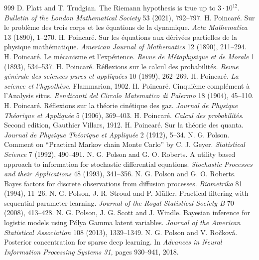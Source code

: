 \begin{thebibliography}{999}
 D. Platt and T. Trudgian. The Riemann hypothesis is true up to $3\cdot10^{12}$. \emph{Bulletin of the London Mathematical Society} 53 (2021), 792--797.
 H. Poincar\'e. Sur le probl\`eme des trois corps et les \'equations de la dynamique. \emph{Acta Mathematica} 13 (1890), 1--270.
 H. Poincar\'e. Sur les \'equations aux d\'eriv\'ees partielles de la physique math\'ematique. \emph{American Journal of Mathematics} 12 (1890), 211--294.
 H. Poincar\'e. Le m\'ecanisme et l'exp\'erience. \emph{Revue de M\'etaphysique et de Morale} 1 (1893), 534--537.
 H. Poincar\'e. R\'eflexions sur le calcul des probabilit\'es. \emph{Revue g\'en\'erale des sciences pures et appliqu\'ees} 10 (1899), 262--269.
 H. Poincar\'e. \emph{La science et l'hypoth\`ese}. Flammarion, 1902.
 H. Poincar\'e. Cinqui\`eme compl\'ement \`a l'Analysis situs. \emph{Rendiconti del Circolo Matematico di Palermo} 18 (1904), 45--110.
 H. Poincar\'e. R\'eflexions sur la th\'eorie cin\'etique des gaz. \emph{Journal de Physique Th\'eorique et Appliqu\'ee} 5 (1906), 369--403.
 H. Poincar\'e. \emph{Calcul des probabilit\'es}. Second edition, Gauthier Villars, 1912.
 H. Poincar\'e. Sur la th\'eorie des quanta. \emph{Journal de Physique Th\'eorique et Appliqu\'ee} 2 (1912), 5--34.
 N. G. Polson. Comment on ``Practical Markov chain Monte Carlo'' by C. J. Geyer. \emph{Statistical Science} 7 (1992), 490--491.
 N. G. Polson and G. O. Roberts. A utility based approach to information for stochastic differential equations. \emph{Stochastic Processes and their Applications} 48 (1993), 341--356.
 N. G. Polson and G. O. Roberts. Bayes factors for discrete observations from diffusion processes. \emph{Biometrika} 81 (1994), 11--26.
 N. G. Polson, J. R. Stroud and P. M\"uller. Practical filtering with sequential parameter learning. \emph{Journal of the Royal Statistical Society B} 70 (2008), 413--428.
 N. G. Polson, J. G. Scott and J. Windle. Bayesian inference for logistic models using P\'olya Gamma latent variables. \emph{Journal of the American Statistical Association} 108 (2013), 1339--1349.
 N. G. Polson and V. Ro\v{c}kov\'a. Posterior concentration for sparse deep learning. In \emph{Advances in Neural Information Processing Systems 31}, pages 930--941, 2018.

\end{thebibliography}
